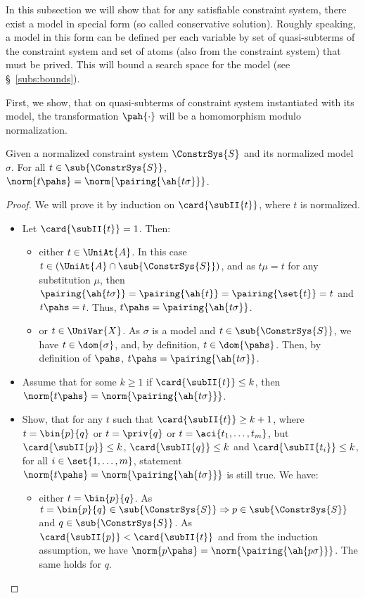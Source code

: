 In this subsection we will show that for any satisfiable constraint system, there exist a model in special form (so called conservative solution). 
Roughly speaking, a model in this form can be defined per each variable by set of quasi-subterms of the constraint system and set of atoms (also from the constraint system) that must be prived.
This will bound a search space for the model (see \S~\ref{subs:bounds}).

First, we show, that on quasi-subterms of constraint system instantiated with its model, the transformation $\pah{\cdot}$ will be a homomorphism modulo normalization. \begin{prop}\label{prop:subt}
Given a normalized constraint system $\ConstrSys{S}$ and its  normalized model $\sigma$.
For all $t \in \sub{\ConstrSys{S}}$, $\norm{t\pahs} = \norm{\pairing{\ah{t\sigma}}} $.
 \begin{proof}
  We will prove it by induction on $\card{\subII{t}}$, where $t$ is normalized. 
\begin{itemize}
 \item Let $\card{\subII{t}} = 1$. Then:
	\begin{itemize}
 		\item either $t \in \UniAt{A}$.  In this case $t \in (\UniAt{A} \cap \sub{\ConstrSys{S}})$, and as $t \mu = t $ for any substitution $\mu$, then  $\pairing{\ah{t\sigma}} = \pairing{\ah{t}}  = \pairing{\set{t}}= t$ and $t\pahs = t$. Thus, $t\pahs = \pairing{\ah{t\sigma}} $.

		\item or $t \in \UniVar{X}$. As $\sigma$ is a model and $t\in \sub{\ConstrSys{S}}$, we have $t \in \dom{\sigma}$, and, by definition, $t \in \dom{\pahs}$. Then, by definition of $\pahs$, $t\pahs = \pairing{\ah{t\sigma}}$.
	\end{itemize}

 \item Assume that for some $k \geq 1$ if $\card{\subII{t}} \leq k$, then $\norm{t\pahs} = \norm{\pairing{\ah{t\sigma}}} $.
 \item Show, that for any $t$ such that $\card{\subII{t}} \geq k+1$, where $t=\bin{p}{q}$ 
or $t=\priv{q}$ 
 or $t=\aci{t_1, \dots, t_m}$,
but $\card{\subII{p}} \leq k$, $\card{\subII{q}} \leq k$ and $\card{\subII{t_i}}\leq k$, for all $i\in\set{1,\dots,m}$,
 statement  $\norm{t\pahs} = \norm{\pairing{\ah{t\sigma}}} $ is still true. 
 We have: 
	\begin{itemize}
 		\item either $t = \bin{p}{q}$. As $t = \bin{p}{q} \in \sub{\ConstrSys{S}} \Rightarrow p \in \sub{\ConstrSys{S}}$ and $q \in \sub{\ConstrSys{S}}$. As $\card{\subII{p}} < \card{\subII{t}}$  and from the induction assumption, we have $\norm{p\pahs} = \norm{\pairing{\ah{p\sigma}}}$. The same holds for $q$.


\end{itemize}
\end{itemize}
\end{proof}
\end{prop}
